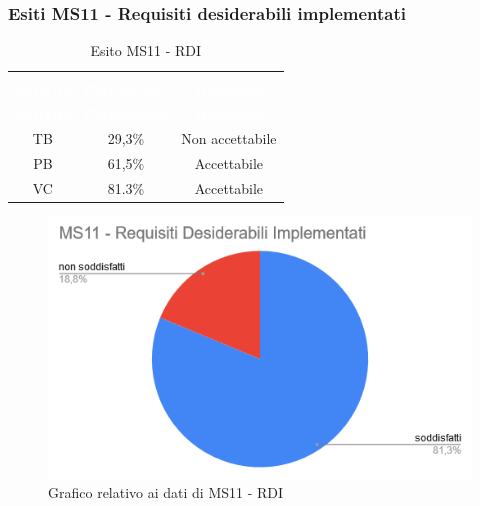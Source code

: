 \subsubsection{Esiti MS11 - Requisiti desiderabili implementati}
\begin{longtable}{c c c}
\rowcolor{white}\caption{Esito MS11 - RDI} \\
	\rowcolor{redafk}
\textcolor{white}{\textbf{Attività}} &
\textcolor{white}{\textbf{Percentuale}} & 
\textcolor{white}{\textbf{Riscontro}} \\
	\endfirsthead
\textcolor{white}{\textbf{Attività}} &
\textcolor{white}{\textbf{Percentuale}} & 
\textcolor{white}{\textbf{Riscontro}} \\
	\endhead
	TB & 29,3\% & Non accettabile \\
	PB & 61,5\% & Accettabile \\
	VC & 81.3\% & Accettabile \\
\end{longtable}

\begin{figure}[H]
\centering
\includegraphics[scale=0.7]{./img/MS11.png}
\caption{Grafico relativo ai dati di MS11 - RDI}
\end{figure}

